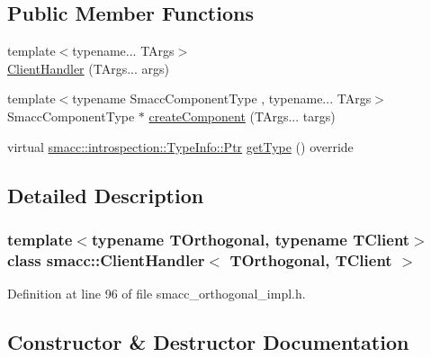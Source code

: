 \subsection*{Public Member Functions}
\begin{DoxyCompactItemize}
\item 
{\footnotesize template$<$typename... T\+Args$>$ }\\\hyperlink{classsmacc_1_1ClientHandler_a5f92ec0fcc8bf24d2d5ef6eb60e987d7}{Client\+Handler} (T\+Args... args)
\item 
{\footnotesize template$<$typename Smacc\+Component\+Type , typename... T\+Args$>$ }\\Smacc\+Component\+Type $\ast$ \hyperlink{classsmacc_1_1ClientHandler_a4a9adad4c37104586c9b595d9030bb3c}{create\+Component} (T\+Args... targs)
\item 
virtual \hyperlink{classsmacc_1_1introspection_1_1TypeInfo_aa6ffd9c39811d59f7c771941b7fad860}{smacc\+::introspection\+::\+Type\+Info\+::\+Ptr} \hyperlink{classsmacc_1_1ClientHandler_a018a50262de782c479414cf18daddac9}{get\+Type} () override
\end{DoxyCompactItemize}


\subsection{Detailed Description}
\subsubsection*{template$<$typename T\+Orthogonal, typename T\+Client$>$\newline
class smacc\+::\+Client\+Handler$<$ T\+Orthogonal, T\+Client $>$}



Definition at line 96 of file smacc\+\_\+orthogonal\+\_\+impl.\+h.



\subsection{Constructor \& Destructor Documentation}
\mbox{\label{classsmacc_1_1ClientHandler_a5f92ec0fcc8bf24d2d5ef6eb60e987d7}} 
